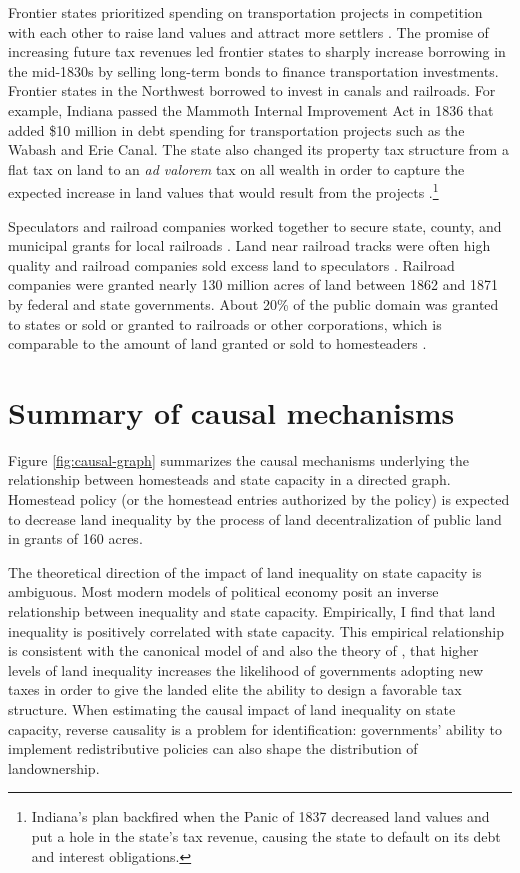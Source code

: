 Frontier states prioritized spending on transportation projects in competition with each other to raise land values and attract more settlers \citep{sylla1998anatomy}. The promise of increasing future tax revenues led frontier states to sharply increase borrowing in the mid-1830s by selling long-term bonds to finance transportation investments. Frontier states in the Northwest borrowed to invest in canals and railroads. For example, Indiana passed the Mammoth Internal Improvement Act in 1836 that added \$10 million in debt spending for transportation projects such as the Wabash and Erie Canal. The state also changed its property tax structure from a flat tax on land to an \emph{ad valorem} tax on all wealth in order to capture the expected increase in land values that would result from the projects \citep{wallis2004sovereign}.\footnote{Indiana's plan backfired when the Panic of 1837 decreased land values and put a hole in the state's tax revenue, causing the state to default on its debt and interest obligations.}

Speculators and railroad companies worked together to secure state, county, and municipal grants for local railroads \citep{gates1939land}. Land near railroad tracks were often high quality and railroad companies sold excess land to speculators \citep{murtazashvili2013political}. Railroad companies were granted nearly 130 million acres of land between 1862 and 1871 by federal and state governments. About 20\% of the public domain was granted to states or sold or granted to railroads or other corporations, which is comparable to the amount of land granted or sold to homesteaders \citep{shanks2005homestead}. 

\section{Summary of causal mechanisms}

Figure \ref{fig:causal-graph} summarizes the causal mechanisms underlying the relationship between homesteads and state capacity in a directed graph. Homestead policy (or the homestead entries authorized by the policy) is expected to decrease land inequality by the process of land decentralization of public land in grants of 160 acres.

The theoretical direction of the impact of land inequality on state capacity is ambiguous. Most modern models of political economy posit an inverse relationship between inequality and state capacity. Empirically, I find that land inequality is positively correlated with state capacity. This empirical relationship is consistent with the canonical model of \citet{meltzer1981rational} and also the theory of \cite{mares2015non}, that higher levels of land inequality increases the likelihood of governments adopting new taxes in order to give the landed elite the ability to design a favorable tax structure. When estimating the causal impact of land inequality on state capacity, reverse causality is a problem for identification: governments' ability to implement redistributive policies can also shape the distribution of landownership.

